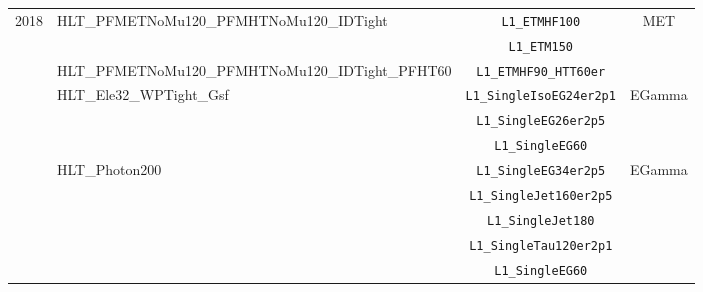 \begin{table}[h]
\begin{tabular}{l l c c}
        \multirow{11}{*}{2018} & \multirow{2}{*}{HLT\_PFMETNoMu120\_PFMHTNoMu120\_IDTight} & \texttt{L1\_ETMHF100}           & \multirow{3}{*}{MET}          \\
                               &                                                           & \texttt{L1\_ETM150}             &                               \\
                               & HLT\_PFMETNoMu120\_PFMHTNoMu120\_IDTight\_PFHT60          & \texttt{L1\_ETMHF90\_HTT60er}   &                               \\\cline{2-4}
                               & \multirow{3}{*}{HLT\_Ele32\_WPTight\_Gsf}                 & \texttt{L1\_SingleIsoEG24er2p1} & \multirow{3}{*}{EGamma}       \\
                               &                                                           & \texttt{L1\_SingleEG26er2p5}    &                               \\
                               &                                                           & \texttt{L1\_SingleEG60}         &                               \\\cline{2-4}

                               & \multirow{5}{*}{HLT\_Photon200}                           & \texttt{L1\_SingleEG34er2p5}    & \multirow{5}{*}{EGamma}       \\
                               &                                                           & \texttt{L1\_SingleJet160er2p5}  &                               \\
                               &                                                           & \texttt{L1\_SingleJet180}       &                               \\
                               &                                                           & \texttt{L1\_SingleTau120er2p1}  &                               \\
                               &                                                           & \texttt{L1\_SingleEG60}         &                               \\\hline

        \hline\hline %
    \end{tabular}

    \label{tab:triggers}
\end{table}

